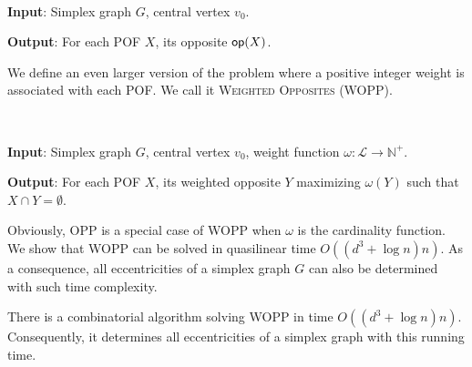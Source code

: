 \documentclass[a4paper,UKenglish,numberwithinsect,cleveref, autoref]{lipics-v2021}
\newcommand{\card}[1]{\left| #1 \right|}
\newcommand{\opp}{\mbox{\textsf{op}}}
\begin{document}
\begin{definition}[OPP]~

\textbf{Input}: Simplex graph $G$, central vertex $v_0$.

\textbf{Output}: For each POF $X$, its opposite $\opp(X)$.
\label{def:dpp}
\end{definition}

We define an even larger version of the problem where a positive integer weight is associated with each POF. We call it \textsc{Weighted Opposites} (WOPP).

\begin{definition}[WOPP]~

\textbf{Input}: Simplex graph $G$, central vertex $v_0$, weight function $\omega : \mathcal{L} \rightarrow \mathbb{N}^+$.

\textbf{Output}: For each POF $X$, its weighted opposite $Y$ maximizing $\omega(Y)$ such that $X \cap Y = \emptyset$.
\label{def:wdpp}
\end{definition}

Obviously, OPP is a special case of WOPP when $\omega$ is the cardinality function. We show that WOPP can be solved in quasilinear time $O((d^3+\log n)n)$. As a consequence, all eccentricities of a simplex graph $G$ can also be determined with such time complexity. 


\begin{theorem}
There is a combinatorial algorithm solving WOPP in time $O((d^3+\log n)n)$. Consequently, it determines all eccentricities of a simplex graph with this running time.
\label{th:linear_simplex_teaser}
\end{theorem}
\end{document}
